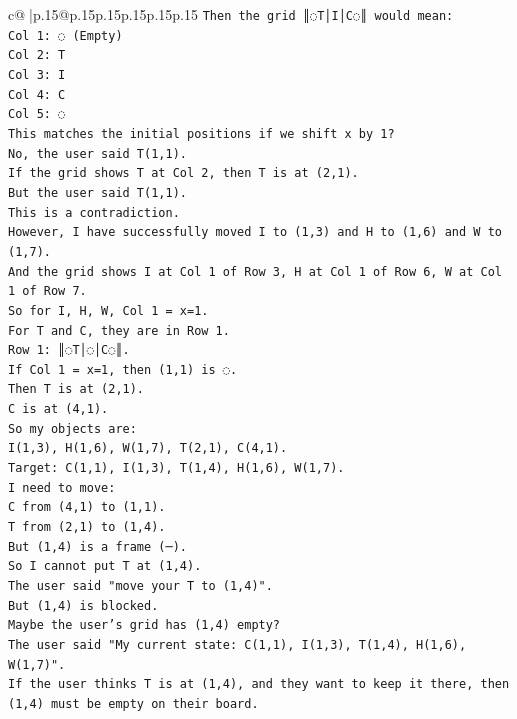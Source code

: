 \documentclass{article}
\begin{document}
{\begin{supertabular}{c@{$\;$}|p{.15\linewidth}@{}p{.15\linewidth}p{.15\linewidth}p{.15\linewidth}p{.15\linewidth}p{.15\linewidth}}
{{{\texttt{Then the grid ║◌T│I│C◌║ would mean:} \\
\texttt{Col 1: ◌ (Empty)} \\
\texttt{Col 2: T} \\
\texttt{Col 3: I} \\
\texttt{Col 4: C} \\
\texttt{Col 5: ◌} \\
\texttt{This matches the initial positions if we shift x by 1?} \\
\texttt{No, the user said T(1,1).} \\
\texttt{If the grid shows T at Col 2, then T is at (2,1).} \\
\texttt{But the user said T(1,1).} \\
\texttt{This is a contradiction.} \\
\texttt{However, I have successfully moved I to (1,3) and H to (1,6) and W to (1,7).} \\
\texttt{And the grid shows I at Col 1 of Row 3, H at Col 1 of Row 6, W at Col 1 of Row 7.} \\
\texttt{So for I, H, W, Col 1 = x=1.} \\
\texttt{For T and C, they are in Row 1.} \\
\texttt{Row 1: ║◌T│◌│C◌║.} \\
\texttt{If Col 1 = x=1, then (1,1) is ◌.} \\
\texttt{Then T is at (2,1).} \\
\texttt{C is at (4,1).} \\
\texttt{So my objects are:} \\
\texttt{I(1,3), H(1,6), W(1,7), T(2,1), C(4,1).} \\
\texttt{Target: C(1,1), I(1,3), T(1,4), H(1,6), W(1,7).} \\
\texttt{I need to move:} \\
\texttt{C from (4,1) to (1,1).} \\
\texttt{T from (2,1) to (1,4).} \\
\texttt{But (1,4) is a frame (─).} \\
\texttt{So I cannot put T at (1,4).} \\
\texttt{The user said "move your T to (1,4)".} \\
\texttt{But (1,4) is blocked.} \\
\texttt{Maybe the user's grid has (1,4) empty?} \\
\texttt{The user said "My current state: C(1,1), I(1,3), T(1,4), H(1,6), W(1,7)".} \\
\texttt{If the user thinks T is at (1,4), and they want to keep it there, then (1,4) must be empty on their board.} \\
}}}
\end{supertabular}}
\end{document}
